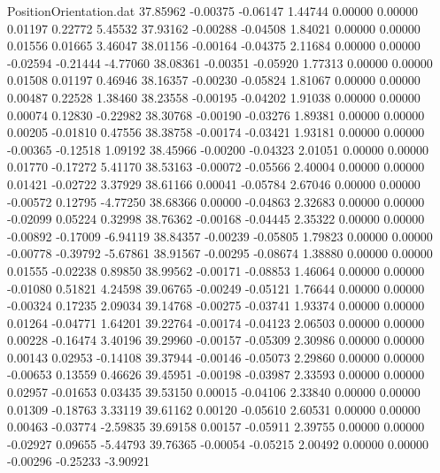 \begin{filecontents}{PositionOrientation.dat}
  37.85962   -0.00375   -0.06147     1.44744    0.00000    0.00000    0.01197    0.22772    5.45532
  37.93162   -0.00288   -0.04508     1.84021    0.00000    0.00000    0.01556    0.01665    3.46047
  38.01156   -0.00164   -0.04375     2.11684    0.00000    0.00000   -0.02594   -0.21444   -4.77060
  38.08361   -0.00351   -0.05920     1.77313    0.00000    0.00000    0.01508    0.01197    0.46946
  38.16357   -0.00230   -0.05824     1.81067    0.00000    0.00000    0.00487    0.22528    1.38460
  38.23558   -0.00195   -0.04202     1.91038    0.00000    0.00000    0.00074    0.12830   -0.22982
  38.30768   -0.00190   -0.03276     1.89381    0.00000    0.00000    0.00205   -0.01810    0.47556
  38.38758   -0.00174   -0.03421     1.93181    0.00000    0.00000   -0.00365   -0.12518    1.09192
  38.45966   -0.00200   -0.04323     2.01051    0.00000    0.00000    0.01770   -0.17272    5.41170
  38.53163   -0.00072   -0.05566     2.40004    0.00000    0.00000    0.01421   -0.02722    3.37929
  38.61166    0.00041   -0.05784     2.67046    0.00000    0.00000   -0.00572    0.12795   -4.77250
  38.68366    0.00000   -0.04863     2.32683    0.00000    0.00000   -0.02099    0.05224    0.32998
  38.76362   -0.00168   -0.04445     2.35322    0.00000    0.00000   -0.00892   -0.17009   -6.94119
  38.84357   -0.00239   -0.05805     1.79823    0.00000    0.00000   -0.00778   -0.39792   -5.67861
  38.91567   -0.00295   -0.08674     1.38880    0.00000    0.00000    0.01555   -0.02238    0.89850
  38.99562   -0.00171   -0.08853     1.46064    0.00000    0.00000   -0.01080    0.51821    4.24598
  39.06765   -0.00249   -0.05121     1.76644    0.00000    0.00000   -0.00324    0.17235    2.09034
  39.14768   -0.00275   -0.03741     1.93374    0.00000    0.00000    0.01264   -0.04771    1.64201
  39.22764   -0.00174   -0.04123     2.06503    0.00000    0.00000    0.00228   -0.16474    3.40196
  39.29960   -0.00157   -0.05309     2.30986    0.00000    0.00000    0.00143    0.02953   -0.14108
  39.37944   -0.00146   -0.05073     2.29860    0.00000    0.00000   -0.00653    0.13559    0.46626
  39.45951   -0.00198   -0.03987     2.33593    0.00000    0.00000    0.02957   -0.01653    0.03435
  39.53150    0.00015   -0.04106     2.33840    0.00000    0.00000    0.01309   -0.18763    3.33119
  39.61162    0.00120   -0.05610     2.60531    0.00000    0.00000    0.00463   -0.03774   -2.59835
  39.69158    0.00157   -0.05911     2.39755    0.00000    0.00000   -0.02927    0.09655   -5.44793
  39.76365   -0.00054   -0.05215     2.00492    0.00000    0.00000   -0.00296   -0.25233   -3.90921

\end{filecontents}

